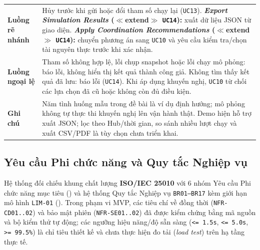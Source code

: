 {\begin{longtable}{>{\raggedright\arraybackslash\bfseries}p{3.5cm} >{\raggedright\arraybackslash}p{\dimexpr\textwidth-3.5cm-4\tabcolsep\relax}}
Luồng rẽ nhánh & Hủy trước khi gửi hoặc đổi tham số chạy lại (\texttt{UC13}). \textbf{\textit{Export Simulation Results} ($\ll$extend$\gg$ \texttt{UC14}):} xuất dữ liệu JSON từ giao diện. \textbf{\textit{Apply Coordination Recommendations} ($\ll$extend$\gg$ \texttt{UC14}):} chuyển phương án sang \texttt{UC10} và yêu cầu kiểm tra/chọn tài nguyên thực trước khi xác nhận. \\
Luồng ngoại lệ & Tham số không hợp lệ, lỗi chụp snapshot hoặc lỗi chạy mô phỏng: báo lỗi, không hiển thị kết quả thành công giả. Không tìm thấy kết quả đã lưu: báo lỗi (\texttt{UC14}). Khi áp dụng khuyến nghị, \texttt{UC10} từ chối các lựa chọn đã cũ hoặc không còn đủ điều kiện. \\
Ghi chú & Năm tình huống mẫu trong đề bài là ví dụ định hướng; mô phỏng không tự thực thi khuyến nghị lên vận hành thật. Demo hiện hỗ trợ xuất JSON; lọc theo Hub/thời gian, so sánh nhiều lượt chạy và xuất CSV/PDF là tùy chọn chưa triển khai. \\
\end{longtable}
}

\subsection{Yêu cầu Phi chức năng và Quy tắc Nghiệp vụ}

Hệ thống đối chiếu khung chất lượng \textbf{ISO/IEC 25010} với 6 nhóm Yêu cầu Phi chức năng mục tiêu () và hệ thống Quy tắc Nghiệp vụ \texttt{BR01--BR17} kèm giới hạn mô hình \texttt{LIM-01} (). Trong phạm vi MVP, các tiêu chí về đồng thời (\texttt{NFR-CD01..02}) và bảo mật phiên (\texttt{NFR-SE01..02}) đã được kiểm chứng bằng mã nguồn và bộ kiểm thử tự động; các ngưỡng hiệu năng/độ sẵn sàng (\texttt{<= 1.5s}, \texttt{<= 5.0s}, \texttt{>= 99.5\%}) là chỉ tiêu thiết kế và chưa thực hiện đo tải (\textit{load test}) trên hạ tầng thực tế.

